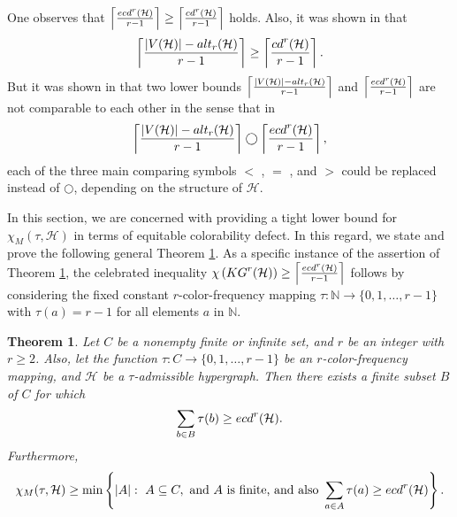 \documentclass[11pt]{amsart}
\newtheorem{theorem}{Theorem} %
\theoremstyle{definition}
\begin{document}
One observes that $\left\lceil \frac{ {\rm ecd}^r({\mathcal H}) }{r-1} \right\rceil  \geq \left\lceil \frac{ {\rm cd}^r({\mathcal H}) }{r-1} \right\rceil $
holds. Also, it was shown in \cite{2013arXiv1302.5394A} that
$$\left\lceil{ |V({\mathcal H})|-{\rm alt}_r({\mathcal H})\over r-1}\right\rceil \geq \left\lceil \frac{ {\rm cd}^r({\mathcal H}) }{r-1} \right\rceil .$$
But it was shown in \cite{ABYAZISANI2018229,arsmc/SaniAT18} that two lower bounds
$\left\lceil{ |V({\mathcal H})|-{\rm alt}_r({\mathcal H})\over r-1}\right\rceil$ and
$\left\lceil \frac{ {\rm ecd}^r({\mathcal H}) }{r-1} \right\rceil$ are not comparable to each other in the sense that in
$$\left\lceil{ |V({\mathcal H})|-{\rm alt}_r({\mathcal H})\over r-1}\right\rceil \bigcirc \left\lceil \frac{ {\rm ecd}^r({\mathcal H}) }{r-1} \right\rceil ,$$
each of the three main comparing symbols $<$ , $=$ , and $>$ could be replaced instead of $\bigcirc$, depending on the structure of ${\mathcal{H}}$.

In this section, we are concerned with providing a tight lower bound for $\chi_M(\tau, {\mathcal H})$ in terms of equitable colorability defect.
In this regard, we state and prove the following general Theorem \ref{mainthmSaeed2}.
As a specific instance of the assertion of Theorem \ref{mainthmSaeed2}, the celebrated inequality
$\chi\left({\rm KG}^r ({\mathcal H}) \right) \geq \left\lceil \frac{ {\rm ecd}^r({\mathcal H}) }{r-1} \right\rceil $
follows by considering the fixed constant $r$-color-frequency mapping
$\tau: \mathbb{N} \longrightarrow \{0,1,\ldots,r-1\}$ with $\tau (a) = r-1$ for all elements $a$ in $ \mathbb{N} $.

\begin{theorem} \label{mainthmSaeed2}
	Let $C$ be a nonempty finite or infinite set, and $r$ be an integer with $r\geq 2$.
	Also, let the function $\tau: C \longrightarrow \{0,1,\ldots,r-1\}$ be an $r$-color-frequency mapping, and ${\mathcal H}$ be a $\tau$-admissible hypergraph. Then
	there exists a finite subset
	$B$ of $C$ for which
	$$\sum_{b\in B}\tau(b) \geq  {\rm ecd}^r({\mathcal H}) .$$
	Furthermore,
	$$\chi_M(\tau,{\mathcal H})\geq \min\left\{|A|:\   A \subseteq C, \mbox{ and } A \mbox{ is finite,}  \mbox{ and also } \sum_{a\in A}\tau(a) \geq  {\rm ecd}^r({\mathcal H})\right\}.$$
\end{theorem}
\end{document}
